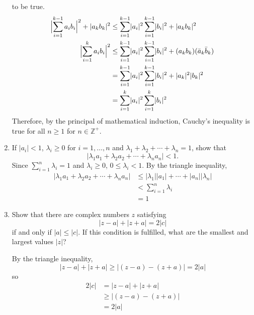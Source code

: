 \begin{enumerate}
\[  \]
  to be true.
  \begin{align*}
    \Bigl\lvert\sum_{i = 1}^{k - 1}a_ib_i\Bigr\rvert^2 + \lvert a_kb_k\rvert^2
    & \leq \sum_{i = 1}^{k - 1}\lvert a_i\rvert^2
      \sum_{i = 1}^{k - 1}\lvert b_i\rvert^2 + \lvert a_kb_k\rvert^2\\
    \Bigl\lvert\sum_{i = 1}^ka_ib_i\Bigr\rvert^2
    & \leq \sum_{i = 1}^{k - 1}\lvert a_i\rvert^2
      \sum_{i = 1}^{k - 1}\lvert b_i\rvert^2 + (a_kb_k)(\bar{a}_k\bar{b}_k)\\
    & = \sum_{i = 1}^{k - 1}\lvert a_i\rvert^2
      \sum_{i = 1}^{k - 1}\lvert b_i\rvert^2 + \lvert a_k\rvert^2
      \lvert b_k\rvert^2\\
    & = \sum_{i = 1}^k\lvert a_i\rvert^2\sum_{i = 1}^k\lvert b_i\rvert^2
  \end{align*}
  Therefore, by the principal of mathematical induction, Cauchy's inequality is
  true for all \(n\geq 1\) for \(n\in\mathbb{Z}^+\).
\item
  If \(\lvert a_i\rvert < 1\), \(\lambda_i\geq 0\) for \(i = 1,\ldots,n\) and
  \(\lambda_1 + \lambda_2 + \cdots + \lambda_n = 1\), show that
  \[
  \lvert\lambda_1a_1 + \lambda_2a_2 + \cdots + \lambda_na_n\rvert < 1.
  \]
  Since \(\sum_{i = 1}^n\lambda_i = 1\) and \(\lambda_i\geq 0\),
  \(0\leq \lambda_i < 1\).
  By the triangle inequality,
  \begin{align*}
    \lvert\lambda_1a_1 + \lambda_2a_2 + \cdots + \lambda_na_n\rvert
    & \leq\lvert\lambda_1\rvert\lvert a_1\rvert + \cdots +
      \lvert a_n\rvert\lvert\lambda_n\rvert\\
    & < \sum_{i = 1}^n\lambda_i\\
    & = 1
  \end{align*}
\item
  Show that there are complex numbers \(z\) satisfying
  \[
  \lvert z - a\rvert + \lvert z + a\rvert = 2\lvert c\rvert
  \]
  if and only if \(\lvert a\rvert\leq\lvert c\rvert\).
  If this condition is fulfilled, what are the smallest and largest values
  \(\lvert z\rvert\)?
  \par\smallskip
  By the triangle inequality,
  \[
  \lvert z - a\rvert + \lvert z + a\rvert\geq
  \lvert (z - a) - (z + a)\rvert = 2\lvert a\rvert
  \]
  so
  \begin{align*}
    2\lvert c\rvert & = \lvert z - a\rvert + \lvert z + a\rvert\\
                    & \geq \lvert (z - a) - (z + a)\rvert\\
                    & = 2\lvert a\rvert
  \end{align*}

\end{enumerate}
